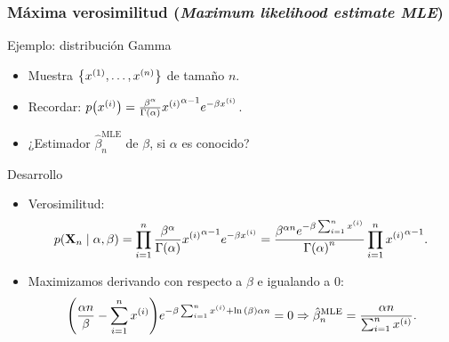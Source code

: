 \documentclass[table]{beamer}
\begin{document}
\begin{frame}
    \frametitle{Máxima verosimilitud (\emph{Maximum likelihood estimate MLE})}
    \begin{exampleblock}{Ejemplo: distribución Gamma}
        \begin{itemize}
            \item Muestra $\bparens{x^{\parens{1}} , \ldots , x^{\parens{n}}}$ de tamaño $n$.
            \item Recordar: $\pdf{x^{\parens{i}}} = \frac{\beta^{\alpha}}{\gammafunc{\alpha}} {x^{\parens{i}}}^{\alpha - 1} e^{- \beta x^{\parens{i}}}$.
            \item ¿Estimador $\hat{\beta}_{n}^{\text{MLE}}$ de $\beta$, si $\alpha$ es conocido?
        \end{itemize}
    \end{exampleblock}
    \begin{block}{Desarrollo}
        \begin{itemize}
            \item Verosimilitud:
                \begin{equation*}
                    \pdf{\Xvec_{n} \mid \alpha, \beta} = \prod_{i = 1}^{n} \frac{\beta^{\alpha}}{\gammafunc{\alpha}} {x^{\parens{i}}}^{\alpha - 1} e^{- \beta x^{\parens{i}}} = \frac{\beta^{\alpha n} e^{- \beta \sum_{i = 1}^{n} x^{\parens{i}}}}{\gammafunc{\alpha}^{n}} \prod_{i = 1}^{n} {x^{\parens{i}}}^{\alpha - 1} .
                \end{equation*}
            \item Maximizamos derivando con respecto a $\beta$ e igualando a $0$:
                \begin{equation*}
                    \parens{\frac{\alpha n}{\beta} - \sum_{i = 1}^{n} x^{\parens{i}}} e^{- \beta \sum_{i = 1}^{n} x^{\parens{i}} + \ln{\parens{\beta}} \alpha n} = 0 \Rightarrow \hat{\beta}_{n}^\text{MLE} = \frac{\alpha n}{\sum_{i = 1}^{n} x^{\parens{i}}} .
                \end{equation*}
        \end{itemize}
    \end{block}
\end{frame}
\end{document}
